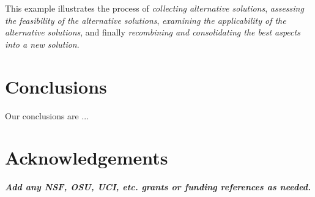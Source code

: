 \documentclass{ppig}
\newcommand{\bold}[1]{\textit{\textbf{\color{aoblue}#1}}}
\begin{document}
This example illustrates the process of \textit{collecting alternative solutions}, 
\textit{assessing the feasibility of the alternative solutions}, \textit{examining the applicability of the alternative solutions}, and finally \textit{recombining and consolidating the best aspects into a new solution}.

\section{Conclusions}
Our conclusions are ...


\section{Acknowledgements}
\bold{Add any NSF, OSU, UCI, etc. grants or funding references as needed.}


 
\end{document}
